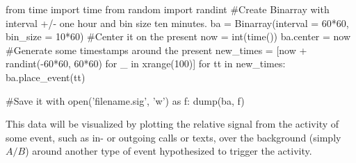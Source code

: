 \begin{snippet}
	from time import time
	from random import randint
	#Create Binarray with interval +/- one hour and bin size ten minutes.
	ba = Binarray(interval = 60*60, bin_size = 10*60)
	#Center it on the present
	now = int(time())
	ba.center = now
	#Generate some timestamps around the present
	new_times = [now + randint(-60*60, 60*60) for _ in xrange(100)]
	for tt in new_times:
		ba.place_event(tt)
	
	#Save it
	with open('filename.sig', 'w') as f:
		dump(ba, f)
\end{snippet}
This data will be visualized by plotting the relative signal from the activity of some event, such as in- or outgoing calls or texts, over the background (simply $A/B$) around another type of event hypothesized to trigger the activity. 

